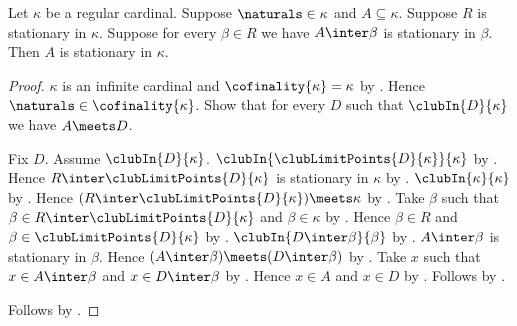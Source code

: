 \begin{theorem}\label{stationary_from_stationarily_many_local_stationary}
    Let $\kappa$ be a regular cardinal.
    Suppose $\naturals\in\kappa$ and $A\subseteq\kappa$.
    Suppose $R$ is stationary in $\kappa$.
    Suppose for every $\beta\in R$ we have
        $A\inter\beta$ is stationary in $\beta$.
    Then $A$ is stationary in $\kappa$.
\end{theorem}
\begin{proof}
    $\kappa$ is an infinite cardinal and $\cofinality{\kappa}=\kappa$
        by .
    Hence $\naturals\in\cofinality{\kappa}$.
    Show that for every $D$ such that $\clubIn{D}{\kappa}$
        we have $A\meets D$.
    \begin{subproof}
        Fix $D$.
        Assume $\clubIn{D}{\kappa}$.
        $\clubIn{\clubLimitPoints{D}{\kappa}}{\kappa}$
            by .
        Hence $R\inter\clubLimitPoints{D}{\kappa}$ is stationary in $\kappa$
            by .
        $\clubIn{\kappa}{\kappa}$
            by .
        Hence $(R\inter\clubLimitPoints{D}{\kappa})\meets\kappa$
            by .
        Take $\beta$ such that
            $\beta\in R\inter\clubLimitPoints{D}{\kappa}$ and
            $\beta\in\kappa$ by .
        Hence $\beta\in R$ and
            $\beta\in\clubLimitPoints{D}{\kappa}$ by .
        $\clubIn{D\inter\beta}{\beta}$
            by .
        $A\inter\beta$ is stationary in $\beta$.
        Hence $(A\inter\beta)\meets(D\inter\beta)$
            by .
        Take $x$ such that $x\in A\inter\beta$ and
            $x\in D\inter\beta$ by .
        Hence $x\in A$ and $x\in D$
            by .
        Follows by .
    \end{subproof}
    Follows by .
\end{proof}
